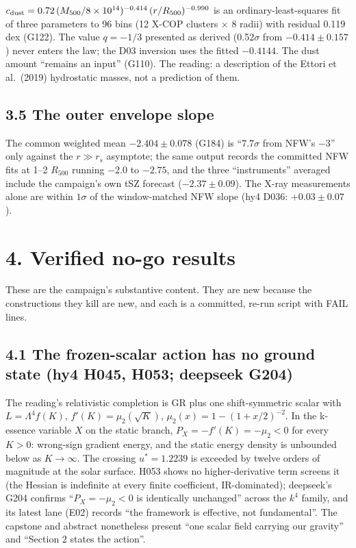 \documentclass[
  11pt,
]{article}
\newcounter{none} %
\begin{document}
\(c_{\rm dust} = 0.72\,(M_{500}/8\times10^{14})^{-0.414}\,(r/R_{500})^{-0.990}\)
is an ordinary-least-squares fit of three parameters to 96 bins (12
X-COP clusters \(\times\) 8 radii) with residual 0.119 dex (G122). The
value \(q = -1/3\) presented as derived (0.52\(\sigma\) from
\(-0.414 \pm 0.157\)) never enters the law; the D03 inversion uses the
fitted \(-0.4144\). The dust amount ``remains an input'' (G110). The
reading: a description of the Ettori et al.~(2019) hydrostatic masses,
not a prediction of them.

\subsection{3.5 The outer envelope
slope}\label{the-outer-envelope-slope}

The common weighted mean \(-2.404 \pm 0.078\) (G184) is ``\(7.7\sigma\)
from NFW's \(-3\)'' only against the \(r \gg r_s\) asymptote; the same
output records the committed NFW fits at 1--2 \(R_{500}\) running
\(-2.0\) to \(-2.75\), and the three ``instruments'' averaged include
the campaign's own tSZ forecast (\(-2.37 \pm 0.09\)). The X-ray
measurements alone are within \(1\sigma\) of the window-matched NFW
slope (hy4 D036: \(+0.03 \pm 0.07\)).

\section{4. Verified no-go results}\label{verified-no-go-results}

These are the campaign's substantive content. They are new because the
constructions they kill are new, and each is a committed, re-run script
with FAIL lines.

\subsection{4.1 The frozen-scalar action has no ground state (hy4 H045,
H053; deepseek
G204)}\label{the-frozen-scalar-action-has-no-ground-state-hy4-h045-h053-deepseek-g204}

The reading's relativistic completion is GR plus one shift-symmetric
scalar with \(L = \Lambda^4 f(K)\), \(f'(K) = \mu_2(\sqrt K)\),
\(\mu_2(x) = 1 - (1 + x/2)^{-2}\). In the k-essence variable \(X\) on
the static branch, \(P_X = -f'(K) = -\mu_2 < 0\) for every \(K > 0\):
wrong-sign gradient energy, and the static energy density is unbounded
below as \(K \to \infty\). The crossing \(u^* = 1.2239\) is exceeded by
twelve orders of magnitude at the solar surface. H053 shows no
higher-derivative term screens it (the Hessian is indefinite at every
finite coefficient, IR-dominated); deepseek's G204 confirms
``\(P_X = -\mu_2 < 0\) is identically unchanged'' across the \(k^4\)
family, and its latest lane (E02) records ``the framework is effective,
not fundamental''. The capstone and abstract nonetheless present ``one
scalar field carrying our gravity'' and ``Section 2 states the action''.
\end{document}
